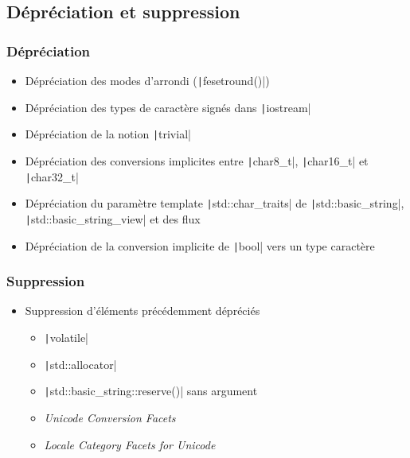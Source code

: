 \documentclass[C++.tex]{subfiles}
\begin{document}
\subsection*{Dépréciation et suppression}
\begin{frame}[fragile]
	\frametitle{Dépréciation}
	\begin{itemize}
		\item Dépréciation des modes d'arrondi (\texttt|fesetround()|)
		\item Dépréciation des types de caractère signés dans \texttt|iostream|
		\item Dépréciation de la notion \texttt|trivial|
		\item Dépréciation des conversions implicites entre \texttt|char8_t|, \texttt|char16_t| et \texttt|char32_t|
		\item Dépréciation du paramètre template \texttt|std::char_traits| de \texttt|std::basic_string|, \texttt|std::basic_string_view| et des flux
		\item Dépréciation de la conversion implicite de \texttt|bool| vers un type caractère
	\end{itemize}

\end{frame}

\begin{frame}[fragile]
	\frametitle{Suppression}
	\begin{itemize}
		\item Suppression d'éléments précédemment dépréciés
		\begin{itemize}
			\item \texttt|volatile|
			\item \texttt|std::allocator|
			\item \texttt|std::basic_string::reserve()| sans argument
			\item \textit{Unicode Conversion Facets}
			\item \textit{Locale Category Facets for Unicode}
		\end{itemize}
	\end{itemize}
\end{frame}
\end{document}
